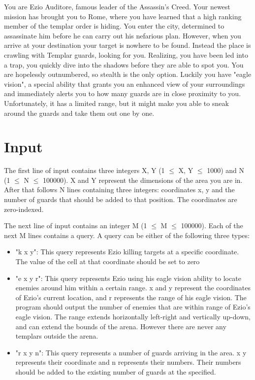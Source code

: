 

You are Ezio Auditore, famous leader of the Assassin's Creed. Your newest mission has brought you to Rome, where you have learned that a high ranking member of the templar order is hiding. You enter the city, determined to assassinate him before he can carry out his nefarious plan.
However, when you arrive at your destination your target is nowhere to be found. Instead the place is crawling with Templar guards, looking for you. Realizing, you have been led into a trap, you quickly dive into the shadows before they are able to spot you.
You are hopelessly outnumbered, so stealth is the only option. Luckily you have "eagle vision", a special ability that grants you an enhanced view of your surroundings and immediately alerts you to how many guards are in close proximity to you. Unfortunately, it has a limited range, but it might make you able to sneak around the guards and take them out one by one.

\section*{Input}

The first line of input contains three integers X, Y (1 $\le$ X, Y $\le$ 1000) and N (1 $\le$ N $\le$ 100000). X and Y represent the dimensions of the area you are in. After that follows N lines containing three integers: coordinates x, y and the number of guards that should be added to that position. The coordinates are zero-indexed.

The next line of input contains an integer M (1 $\le$ M $\le$ 100000). Each of the next M lines contains a query. A query can be either of the following three types:

\begin{itemize}
    \item "k x y": This query represents Ezio killing targets at a specific coordinate. The value of the cell at that coordinate should be set to zero
    \item "e x y r": This query represents Ezio using his eagle vision ability to locate enemies around him within a certain range. x and y represent the coordinates of Ezio's current location, and r represents the range of his eagle vision. The program should output the number of enemies that are within range of Ezio's eagle vision. The range extends horizontally left-right and vertically up-down, and can extend the bounds of the arena. However there are never any templars outside the arena.
    \item "r x y n": This query represents a number of guards arriving in the area. x y represents their coordinate and n represents their numbers. Their numbers should be added to the existing number of guards at the specified.
\end{itemize}

